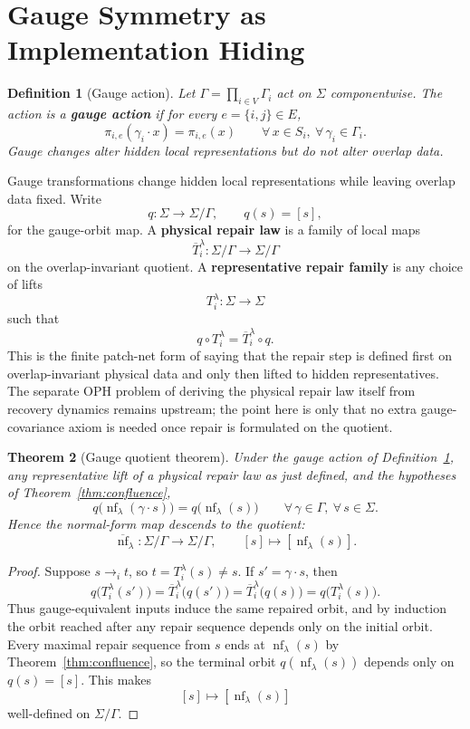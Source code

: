 \documentclass[11pt]{article}
\newtheorem{theorem}{Theorem}[section]
\newtheorem{definition}[theorem]{Definition}
\theoremstyle{remark}
\theoremstyle{plain}
\begin{document}
\section{Gauge Symmetry as Implementation Hiding}

\begin{definition}[Gauge action]\label{def:gauge}
Let $\Gamma = \prod_{i\in V}\Gamma_i$ act on $\Sigma$ componentwise. The action is a \textbf{gauge action} if for every $e=\{i,j\}\in E$,
\[
\pi_{i,e}(\gamma_i\cdot x)=\pi_{i,e}(x)
\qquad
\forall\, x\in S_i,\ \forall\, \gamma_i\in \Gamma_i.
\]
Gauge changes alter hidden local representations but do not alter overlap data.
\end{definition}

Gauge transformations change hidden local representations while leaving overlap data fixed. Write
\[
q:\Sigma\to \Sigma/\Gamma,
\qquad
q(s)=[s],
\]
for the gauge-orbit map. A \textbf{physical repair law} is a family of local maps
\[
\overline T_i^\lambda:\Sigma/\Gamma\to \Sigma/\Gamma
\]
on the overlap-invariant quotient. A \textbf{representative repair family} is any choice of lifts
\[
T_i^\lambda:\Sigma\to\Sigma
\]
such that
\[
q\circ T_i^\lambda
=
\overline T_i^\lambda\circ q.
\]
This is the finite patch-net form of saying that the repair step is defined first on
overlap-invariant physical data and only then lifted to hidden representatives. The separate OPH
problem of deriving the physical repair law itself from recovery dynamics remains upstream; the
point here is only that no extra gauge-covariance axiom is needed once repair is formulated on the
quotient.

\begin{theorem}[Gauge quotient theorem]\label{thm:gauge}
Under the gauge action of Definition~\ref{def:gauge}, any representative lift of a physical repair
law as just defined, and the hypotheses of Theorem~\ref{thm:confluence},
\[
q\bigl(\operatorname{nf}_\lambda(\gamma\cdot s)\bigr)
=
q\bigl(\operatorname{nf}_\lambda(s)\bigr)
\qquad
\forall\, \gamma\in\Gamma,\ \forall\, s\in\Sigma.
\]
Hence the normal-form map descends to the quotient:
\[
\overline{\operatorname{nf}}_\lambda:\Sigma/\Gamma \to \Sigma/\Gamma,
\qquad
[s]\mapsto [\operatorname{nf}_\lambda(s)].
\]
\end{theorem}

\begin{proof}
Suppose $s\to_i t$, so $t=T_i^\lambda(s)\neq s$. If $s'=\gamma\cdot s$, then
\[
q\bigl(T_i^\lambda(s')\bigr)
=
\overline T_i^\lambda\bigl(q(s')\bigr)
=
\overline T_i^\lambda\bigl(q(s)\bigr)
=
q\bigl(T_i^\lambda(s)\bigr).
\]
Thus gauge-equivalent inputs induce the same repaired orbit, and by induction the orbit reached
after any repair sequence depends only on the initial orbit. Every maximal repair sequence from
$s$ ends at $\operatorname{nf}_\lambda(s)$ by Theorem~\ref{thm:confluence}, so the terminal orbit
$q(\operatorname{nf}_\lambda(s))$ depends only on $q(s)=[s]$. This makes
\[
[s]\longmapsto [\operatorname{nf}_\lambda(s)]
\]
well-defined on $\Sigma/\Gamma$.
\end{proof}
\end{document}
